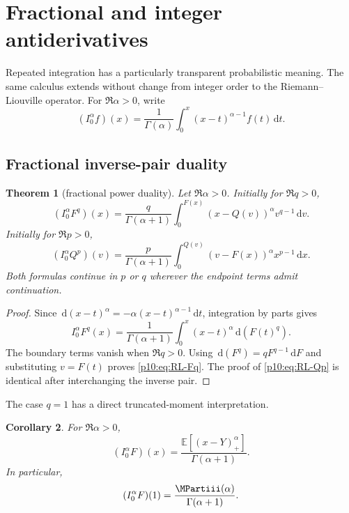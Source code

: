 \documentclass[11pt,oneside]{article}
\newtheorem{theorem}{Theorem}[section]
\newtheorem{corollary}[theorem]{Corollary}
\theoremstyle{definition}
\theoremstyle{remark}
\newcommand{\F}{F}
\newcommand{\Q}{Q}
\newcommand{\E}{\mathbb E}
\newcommand{\dd}{\,\mathrm d}
\newcommand{\1}{\mathbf 1}
\begin{document}
\section{Fractional and integer antiderivatives}

Repeated integration has a particularly transparent probabilistic meaning.  The same
calculus extends without change from integer order to the Riemann--Liouville operator.
For \(\Re\alpha>0\), write
\begin{equation}\label{p10:eq:RLdef}
 (I_0^\alpha f)(x)
 =\frac1{\Gamma(\alpha)}\int_0^x(x-t)^{\alpha-1}f(t)\dd t.
\end{equation}

\subsection{Fractional inverse-pair duality}

\begin{theorem}[fractional power duality]\label{p10:thm:fractional-duality}
Let \(\Re\alpha>0\).  Initially for \(\Re q>0\),
\begin{equation}\label{p10:eq:RL-Fq}
 (I_0^\alpha\F^q)(x)
 =\frac{q}{\Gamma(\alpha+1)}
 \int_0^{\F(x)}(x-\Q(v))^\alpha v^{q-1}\dd v.
\end{equation}
Initially for \(\Re p>0\),
\begin{equation}\label{p10:eq:RL-Qp}
 (I_0^\alpha\Q^p)(v)
 =\frac{p}{\Gamma(\alpha+1)}
 \int_0^{\Q(v)}(v-\F(x))^\alpha x^{p-1}\dd x.
\end{equation}
Both formulas continue in \(p\) or \(q\) wherever the endpoint terms admit continuation.
\end{theorem}

\begin{proof}
Since \(\dd(x-t)^\alpha=-\alpha(x-t)^{\alpha-1}\dd t\), integration by parts gives
\[
 I_0^\alpha\F^q(x)
 =\frac1{\Gamma(\alpha+1)}
 \int_0^x(x-t)^\alpha\dd(\F(t)^q).
\]
The boundary terms vanish when \(\Re q>0\).  Using
\(\dd(\F^q)=q\F^{q-1}\dd\F\) and substituting \(v=\F(t)\) proves
\cref{p10:eq:RL-Fq}.  The proof of \cref{p10:eq:RL-Qp} is identical after interchanging the
inverse pair.
\end{proof}

The case \(q=1\) has a direct truncated-moment interpretation.

\begin{corollary}\label{p10:cor:RL-F-prob}
For \(\Re\alpha>0\),
\begin{equation}\label{p10:eq:RL-F-prob}
 (I_0^\alpha\F)(x)
 =\frac{\E[(x-Y)_+^\alpha]}{\Gamma(\alpha+1)}.
\end{equation}
In particular,
\begin{equation}\label{p10:eq:RL-F-at-one}
 (I_0^\alpha\F)(1)
 =\frac{\MPartiii(\alpha)}{\Gamma(\alpha+1)}.
\end{equation}
\end{corollary}
\end{document}

